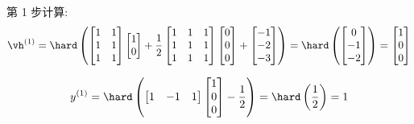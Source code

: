 \documentclass[openany]{ctexbook}
\theoremstyle{kaiti}
\theoremstyle{normal}
\begin{document}
第 1 步计算:
\begin{equation}
  \vh^{(1)}
  =\hard\left(
    \begin{bmatrix}
      1 & 1 \\
      1 & 1 \\
      1 & 1 \\
    \end{bmatrix}
    \begin{bmatrix}
      1 \\ 0 \\
    \end{bmatrix}
    +\frac{1}{2}
    \begin{bmatrix}
      1 & 1 & 1 \\
      1 & 1 & 1 \\
      1 & 1 & 1 \\
    \end{bmatrix}
    \begin{bmatrix}
      0 \\ 0 \\ 0 \\
    \end{bmatrix}
    +
    \begin{bmatrix}
      -1 \\ -2 \\ -3 \\
    \end{bmatrix}
  \right)
  =\hard\left(
    \begin{bmatrix}
      0 \\ -1 \\ -2 \\
    \end{bmatrix}
  \right)
  =
  \begin{bmatrix}
    1 \\ 0 \\ 0 \\
  \end{bmatrix}
\end{equation}

\begin{equation}
  y^{(1)}
  =\hard\left(
    \begin{bmatrix}
      1 & -1 & 1 \\
    \end{bmatrix}
    \begin{bmatrix}
      1 \\ 0 \\ 0 \\
    \end{bmatrix}
    -\frac{1}{2}
  \right)
  =\hard\left(
    \frac{1}{2}
  \right)
  =1
\end{equation}
\end{document}
